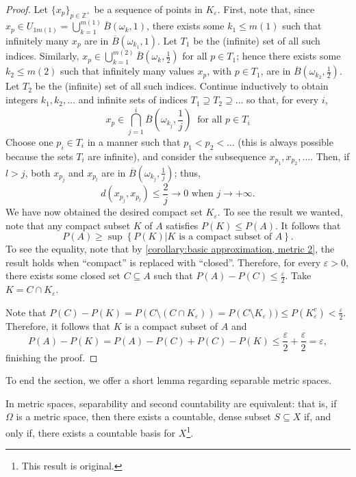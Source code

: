 \begin{proof}
		Let \(\{x_p\}_{p\in\mathbb{Z}^{+}}\) be a sequence of points in \(K_{\varepsilon}\). First, note that, since \(x_p\in U_{1m(1)}=\bigcup_{k=1}^{m(1)}\overline{B}\left(\omega_k,1\right)\), there exists some \(k_1\leq m(1)\) such that infinitely many \(x_p\) are in \(\overline{B}(\omega_{k_1},1)\). Let \(T_1\) be the (infinite) set of all such indices. Similarly, \(x_p\in\bigcup_{k=1}^{m(2)}\overline{B}\left(\omega_k,\frac{1}{2}\right)\) for all \(p\in T_1\); hence there exists some \(k_2\leq m(2)\) such that infinitely many values \(x_p\), with \(p\in T_1\), are in \(\overline{B}\left(\omega_{k_2},\frac{1}{2}\right)\). Let \(T_2\) be the (infinite) set of all such indices. Continue inductively to obtain integers \(k_1,k_2,\dots\) and infinite sets of indices \(T_1\supseteq T_2\supseteq\dots\) so that, for every \(i\),
		\[
				x_p\in\bigcap_{j=1}^{i}\overline{B}\left(\omega_{k_j},\frac{1}{j}\right) ~\text{ for all }p\in T_i
		\]
		Choose one \(p_i\in T_i\) in a manner such that \(p_1<p_2<\dots\) (this is always possible because the sets \(T_i\) are infinite), and consider the subsequence \(x_{p_{1}}, x_{p_{2}},\dots\). Then, if \(l>j\), both \(x_{p_j}\) and \(x_{p_l}\) are in \(\overline{B}\left(\omega_{k_j},\frac{1}{j}\right)\); thus,
		\[
				d(x_{p_j},x_{p_l})\leq \frac{2}{j}\to 0 \text{ when }j\to+\infty
		.\]
		We have now obtained the desired compact set  \(K_{\varepsilon}\). To see the result we wanted, note that any compact subset \(K\) of \(A\) satisfies \(P(K)\leq P(A)\). It follows that
		\[
		P(A)\geq\sup\left\{P(K)\left|K\text{ is a compact subset of }A\right.\right\}
		.\]
		To see the equality, note that by \ref{corollary:basic approximation, metric 2}, the result holds when ``compact'' is replaced with ``closed''. Therefore, for every \(\varepsilon>0\), there exists some closed set \(C\subseteq A\) such that \(P(A)- P(C)\leq\frac{\varepsilon}{2}\). Take \(K=C\cap K_{\varepsilon}\).

		Note that \(P(C)-P(K)=P\left(C\setminus(C\cap K_{\varepsilon})\right)=P(C\setminus K_{\varepsilon}))\leq P(K_{\varepsilon}^c)<\frac{\varepsilon}{2}\). Therefore, it follows that \(K\) is a compact subset of \(A\) and
		\[
				P(A)-P(K)=P(A)-P(C)+P(C)-P(K)\leq \frac{\varepsilon}{2}+\frac{\varepsilon}{2}=\varepsilon
		,\]
		finishing the proof.
\end{proof}
To end the section, we offer a short lemma regarding separable metric spaces.
\begin{lemm}\label{lemma:separability and second countability}
		In metric spaces, separability and second countability are equivalent: that is, if ~\(\Omega\) is a metric space, then there exists a countable, dense subset \(S\subseteq X\) if, and only if, there exists a countable basis for \(X\)\footnote{This result is original.}.
\end{lemm}
